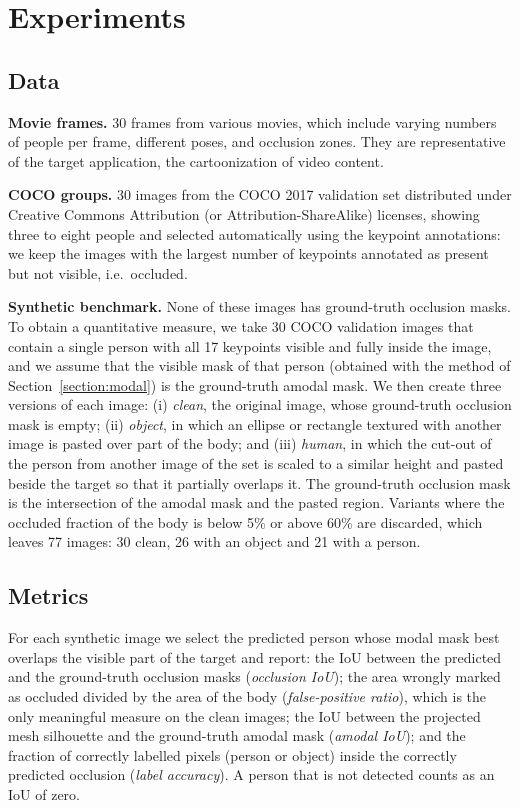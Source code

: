 \documentclass[pdflatex,sn-mathphys-num]{sn-jnl}%
\begin{document}
\section{Experiments}
\label{section:experiments}

\subsection{Data}
\textbf{Movie frames.} 30 frames from various movies, which include varying numbers of people per frame, different poses, and occlusion zones. They are representative of the target application, the cartoonization of video content.

\textbf{COCO groups.} 30 images from the COCO 2017 validation set \citep{cocodataset} distributed under Creative Commons Attribution (or Attribution-ShareAlike) licenses, showing three to eight people and selected automatically using the keypoint annotations: we keep the images with the largest number of keypoints annotated as present but not visible, i.e.\ occluded.

\textbf{Synthetic benchmark.} None of these images has ground-truth occlusion masks. To obtain a quantitative measure, we take 30 COCO validation images that contain a single person with all 17 keypoints visible and fully inside the image, and we assume that the visible mask of that person (obtained with the method of Section~\ref{section:modal}) is the ground-truth amodal mask. We then create three versions of each image: (i) \emph{clean}, the original image, whose ground-truth occlusion mask is empty; (ii) \emph{object}, in which an ellipse or rectangle textured with another image is pasted over part of the body; and (iii) \emph{human}, in which the cut-out of the person from another image of the set is scaled to a similar height and pasted beside the target so that it partially overlaps it. The ground-truth occlusion mask is the intersection of the amodal mask and the pasted region. Variants where the occluded fraction of the body is below 5\% or above 60\% are discarded, which leaves 77 images: 30 clean, 26 with an object and 21 with a person.

\subsection{Metrics}
For each synthetic image we select the predicted person whose modal mask best overlaps the visible part of the target and report: the IoU between the predicted and the ground-truth occlusion masks (\emph{occlusion IoU}); the area wrongly marked as occluded divided by the area of the body (\emph{false-positive ratio}), which is the only meaningful measure on the clean images; the IoU between the projected mesh silhouette and the ground-truth amodal mask (\emph{amodal IoU}); and the fraction of correctly labelled pixels (person or object) inside the correctly predicted occlusion (\emph{label accuracy}). A person that is not detected counts as an IoU of zero.
\end{document}
